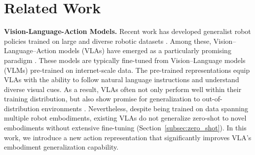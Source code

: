 \section{Related Work}
\label{sec:related_work}

\noindent\textbf{Vision-Language-Action Models.} Recent work has developed generalist robot policies trained on large and diverse robotic datasets \cite{embodimentcollaboration2025openxembodimentroboticlearning, khazatsky2025droidlargescaleinthewildrobot, ebert2021bridgedataboostinggeneralization, pmlr-v229-walke23a, fang2023rh20tcomprehensiveroboticdataset, dasari2020robonetlargescalemultirobotlearning, wu2025robomindbenchmarkmultiembodimentintelligence, pmlr-v164-jang22a, galaxea2025, agibotworldcontributors2025agibotworldcolosseolargescale}. Among these, Vision--Language--Action models (VLAs) have emerged as a particularly promising paradigm \cite{brohan2023rt1roboticstransformerrealworld, embodimentcollaboration2025openxembodimentroboticlearning, kim2024openvlaopensourcevisionlanguageactionmodel, octomodelteam2024octoopensourcegeneralistrobot, black2024pi0visionlanguageactionflowmodel, li2024cogactfoundationalvisionlanguageactionmodel, geminiroboticsteam2025geminiroboticsbringingai, liu2025rdt1bdiffusionfoundationmodel, brohan2023rt2visionlanguageactionmodelstransfer, nvidia2025gr00tn1openfoundation, hancock2025actionslanguagefinetuningvlms, pertsch2025fastefficientactiontokenization, wang2024scalingproprioceptivevisuallearningheterogeneous, zheng2025tracevlavisualtraceprompting, Zhao_2025_CVPR}. These models are typically fine-tuned from Vision--Language models (VLMs) pre-trained on internet-scale data. The pre-trained representations equip VLAs with the ability to follow natural language instructions and understand diverse visual cues. As a result, VLAs often not only perform well within their training distribution, but also show promise for generalization to out-of-distribution environments \cite{intelligence2025pi05visionlanguageactionmodelopenworld, black2024pi0visionlanguageactionflowmodel, kim2024openvlaopensourcevisionlanguageactionmodel, gao2024efficientdatacollectionrobotic, zha2025guidingdatacollectionfactored, hu2025datascalinglawsimitation}. Nevertheless, despite being trained on data spanning multiple robot embodiments, existing VLAs do not generalize zero-shot to novel embodiments without extensive fine-tuning (Section~\ref{subsec:zero_shot}). In this work, we introduce a new action representation that significantly improves VLA's embodiment generalization capability.

